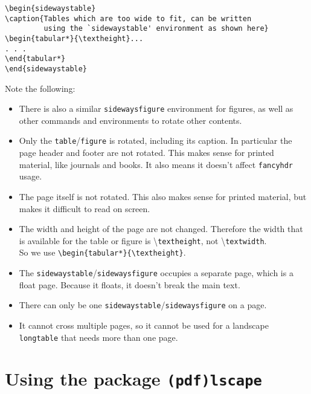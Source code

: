 \documentclass[twoside]{article}
\newcommand\cs[1]{\textbackslash\texttt{#1}}
\begin{document}
\noindent
\begin{boxedminipage}{\textwidth}
\begin{verbatim}
\begin{sidewaystable}
\caption{Tables which are too wide to fit, can be written
         using the `sidewaystable' environment as shown here}
\begin{tabular*}{\textheight}...
. . .
\end{tabular*}
\end{sidewaystable}
\end{verbatim}
\end{boxedminipage}

\medskip

Note the following:
\begin{itemize}
\item There is also a similar \texttt{sidewaysfigure} environment for figures, as well as other commands and environments to rotate other contents.
\item Only the \texttt{table}/\texttt{figure} is rotated, including its caption. In particular the page header and footer are not rotated. This makes sense for printed material, like journals and books. It also means it doesn't affect \texttt{fancyhdr} usage.
\item The page itself is not rotated. This also makes sense for printed material, but makes it difficult to read on screen.
\item The width and height of the page are not changed. Therefore the width that is available for the table or figure is \cs{textheight}, not \cs{textwidth}.\\
So we use \verb|\begin{tabular*}{\textheight}|.
\item The \texttt{sidewaystable}/\texttt{sidewaysfigure} occupies a separate page, which is a float page. Because it floats, it doesn't break the main text.
\item There can only be one \texttt{sidewaystable}/\texttt{sidewaysfigure} on a page.
\item It cannot cross multiple pages, so it cannot be used for a landscape \texttt{longtable} that needs more than one page.
\end{itemize}

\section{Using the package \texttt{(pdf)lscape}}
\label{sec:lscape}
\end{document}
